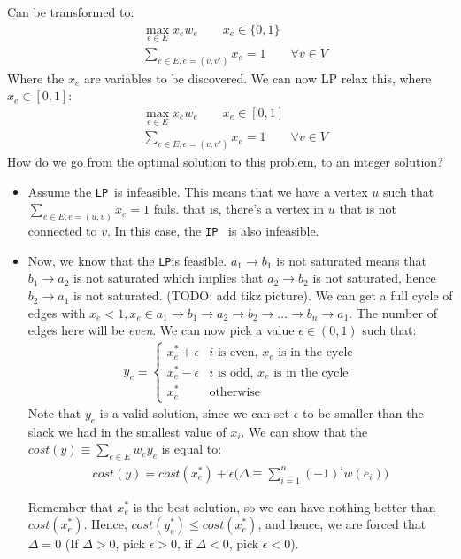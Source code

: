 \documentclass[11pt]{book}
\newcommand{\ip}{\texttt{IP} }
\newcommand{\lp}{\texttt{LP}}
\begin{document}
Can be transformed to:
\begin{align*}
    &\max_{e \in E} x_e w_e \qquad x_e \in \{0, 1\} \\
    &\sum_{e \in E, e = (v, v')} x_e = 1 \qquad \forall v \in V
\end{align*}
Where the $x_e$ are variables to be discovered.  
We can now LP relax this, where $x_e \in [0, 1]$:
\begin{align*}
    &\max_{e \in E} x_e w_e \qquad x_e \in [0, 1] \\
    &\sum_{e \in E, e = (v, v')} x_e = 1 \qquad \forall v \in V
\end{align*}
How do we go from the optimal solution to this problem, to an
integer solution?
\begin{itemize}
    \item Assume the \lp~is infeasible. This means that we have a vertex $u$
        such that $\sum_{e \in E, e = (u, v)} x_e = 1$ fails. that is,
        there's a vertex in $u$ that is not connected to $v$. In this case,
        the \ip~is also infeasible.
    \item Now, we know that the \lp is feasible. $a_1 \rightarrow b_1$ is
        not saturated means that $b_1 \rightarrow a_2$ is not saturated
        which implies that $a_2 \rightarrow b_2$ is not saturated, hence
        $b_2 \rightarrow a_1$ is not saturated. (TODO: add tikz picture).
        We can get a full cycle of edges with 
        $x_e < 1, x_e \in {a_1 \rightarrow b_1 \rightarrow a_2 \rightarrow b_2 \rightarrow \dots \rightarrow b_n \rightarrow a_1}$. The number of
        edges here will be \textit{even}. We can now pick a value $\epsilon \in (0, 1)$
        such that:
        \begin{align*}
        y_e \equiv 
        \begin{cases}
            x_e^* + \epsilon & \text{$i$ is even, $x_e$ is in the cycle} \\
            x_e^* - \epsilon & \text{$i$ is odd, $x_e$ is in the cycle} \\
            x_e^* & \text{otherwise}
        \end{cases}
        \end{align*}
        Note that $y_e$ is a valid solution, since we can set $\epsilon$ to
        be smaller than the slack we had in the smallest value of $x_i$.
        We can show that the $cost(y) \equiv \sum_{e \in E} w_e y_e$ is equal to:
        \begin{align*}
            cost(y) = cost(x_e^*) + \epsilon \bigg(\Delta \equiv \sum_{i=1}^n (-1)^i w(e_i) \bigg)
        \end{align*}

        Remember that $x_e^*$ is the best solution, so we can have nothing
        better than $cost(x_e^*)$. Hence, $cost(y_e^*) \leq cost(x_e^*)$,
        and hence, we are forced that $\Delta = 0$ (If $\Delta > 0$, pick $\epsilon > 0$,
        if $\Delta < 0$, pick $\epsilon < 0$). 

\end{itemize}
\end{document}
